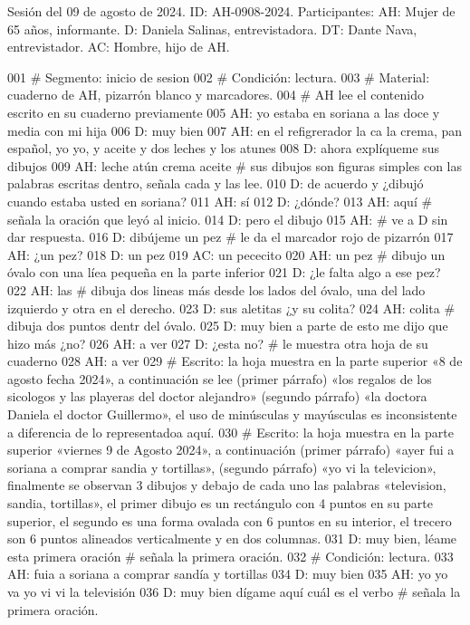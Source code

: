 Sesión del 09 de agosto de 2024.
ID: AH-0908-2024.
Participantes:
AH: Mujer de 65 años, informante.
D: Daniela Salinas, entrevistadora. 
DT: Dante Nava, entrevistador.
AC: Hombre, hijo de AH.

001 # Segmento: inicio de sesion
002 # Condición: lectura.
003 # Material: cuaderno de AH, pizarrón blanco y marcadores.
004 # AH lee el contenido escrito en su cuaderno previamente
005 AH: yo estaba en soriana a las doce y media con mi hija
006 D: muy bien
007 AH: en el refigrerador la ca la crema, pan español, yo yo, y aceite y dos leches y los atunes
008 D: ahora explíqueme sus dibujos
009 AH: leche atún crema aceite # sus dibujos son figuras simples con las palabras escritas dentro, señala cada y las lee.
010 D: de acuerdo y ¿dibujó cuando estaba usted en soriana?
011 AH: sí
012 D: ¿dónde?
013 AH: aquí # señala la oración que leyó al inicio.
014 D: pero el dibujo
015 AH: # ve a D sin dar respuesta.
016 D: dibújeme un pez # le da el marcador rojo de pizarrón
017 AH: ¿un pez?
018 D: un pez
019 AC: un pececito
020 AH: un pez # dibujo un óvalo con una líea pequeña en la parte inferior
021 D: ¿le falta algo a ese pez?
022 AH: las # dibuja dos lineas más desde los lados del óvalo, una del lado izquierdo y otra en el derecho.
023 D: sus aletitas ¿y su colita?
024 AH: colita # dibuja dos puntos dentr del óvalo.
025 D: muy bien a parte de esto me dijo que hizo más ¿no?
026 AH: a ver
027 D: ¿esta no? # le muestra otra hoja de su cuaderno
028 AH: a ver
029 # Escrito: la hoja muestra en la parte superior «8 de agosto fecha 2024», a continuación se lee (primer párrafo) «los regalos de los sicologos y las playeras del doctor alejandro» (segundo párrafo) «la doctora Daniela el doctor Guillermo», el uso de minúsculas y mayúsculas es inconsistente a diferencia de lo representadoa aquí.
030 # Escrito: la hoja muestra en la parte superior «viernes 9  de Agosto 2024», a continuación (primer párrafo) «ayer fui a soriana a comprar sandia y tortillas», (segundo párrafo) «yo vi la televicion», finalmente se observan 3 dibujos y debajo de cada uno las palabras «television, sandia, tortillas», el primer dibujo es un rectángulo con 4 puntos en su parte superior, el segundo es una forma ovalada con 6 puntos en su interior, el trecero son 6 puntos alineados verticalmente y en dos columnas.
031 D: muy bien, léame esta primera oración # señala la primera oración.
032 # Condición: lectura.
033 AH: fuia a soriana a comprar sandía y tortillas
034 D: muy bien
035 AH: yo yo va yo vi vi la televisión
036 D: muy bien dígame aquí cuál es el verbo # señala la primera oración.
